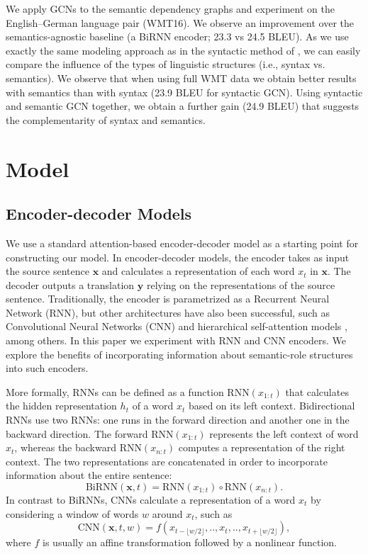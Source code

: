 \documentclass[11pt,a4paper]{article}
\begin{document}
We apply GCNs to the semantic dependency graphs and experiment on the  English--German language pair (WMT16). 
We observe an improvement over the semantics-agnostic baseline (a BiRNN encoder; 23.3 vs 24.5 BLEU). 
As we use exactly the same modeling approach as in the syntactic method of , we can easily compare the influence of the types of linguistic structures (i.e., syntax vs. semantics). 
We observe that when using full WMT data we obtain better results with semantics than with syntax (23.9 BLEU for syntactic GCN).
Using syntactic and semantic GCN together, we obtain a further gain (24.9 BLEU) that suggests the complementarity of syntax and semantics.

\section{Model}


\subsection{Encoder-decoder Models}

We use a standard attention-based encoder-decoder model \cite{bahdanau15iclr} as a starting point for constructing our model.
In encoder-decoder models, the encoder takes as input the source sentence $\mathbf{x}$ and calculates a representation of each word $x_t$ in $\mathbf{x}$. 
The decoder outputs a translation $\mathbf{y}$  relying on the representations of the source sentence.
Traditionally, the encoder is parametrized as a Recurrent Neural Network (RNN), but other architectures have also been successful, such as Convolutional Neural Networks (CNN) \cite{gehring2016convolutional} and hierarchical self-attention models \cite{NIPS2017_7181}, among others.
In this paper we experiment with RNN and CNN encoders. 
We explore the benefits of incorporating information about semantic-role structures into such encoders.

More formally, RNNs \cite{elman1990finding} can be defined as a function $ \mathrm{RNN}(x_{1:t})$ that calculates the hidden representation $h_t$ of a word $x_t$ based on its left context.
Bidirectional RNNs use two RNNs: one runs in the forward direction and another one in the backward direction.
The forward $ \mathrm{RNN}(x_{1:t})$ represents the left context of word $x_t$, whereas the backward $ \mathrm{RNN}(x_{n:t})$ computes a representation of the right context. The two representations are concatenated in order to incorporate information about the entire sentence:  $$ \mathrm{BiRNN}(\mathbf{x},t) =  \mathrm{RNN}(x_{1:t})  \circ  \mathrm{RNN}(x_{n:t}).$$
In contrast to BiRNNs, CNNs \cite{lecun-01a} calculate a representation of a word $x_t$ by considering a window of words $w$ around $x_t$, such as $$ \mathrm{CNN}(\mathbf{x}, t, w) = f(x_{t-\lfloor w/2 \rfloor}, .., x_t, .., x_{t+\lfloor w/2 \rfloor}),$$
where $f$ is usually an affine transformation followed by a nonlinear function.
\end{document}
